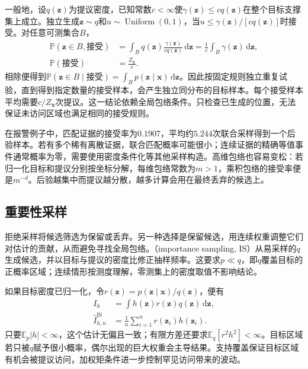 一般地，设$q(\bm{z})$为提议密度，已知常数$c<\infty$使$\gamma(\bm{z})\leq c q(\bm{z})$在整个目标支撑集上成立。独立生成$\bm{z}\sim q$和$u\sim\operatorname{Uniform}(0,1)$，当$u\leq\gamma(\bm{z})/[c q(\bm{z})]$时接受。对任意可测集合$B$，
\begin{equation}
  \begin{aligned}
    \mathbb{P}(\bm{z}\in B,\text{接受})
      &=\int_B q(\bm{z})\frac{\gamma(\bm{z})}{c q(\bm{z})}
        \,\mathrm{d}\bm{z}
        =\frac{1}{c}\int_B\gamma(\bm{z})\,\mathrm{d}\bm{z},\\
    \mathbb{P}(\text{接受})&=\frac{Z_{\bm{x}}}{c}.
  \end{aligned}
  \label{eq:pgm-sampling-rejection}
\end{equation}
相除便得到$\mathbb{P}(\bm{z}\in B\mid\text{接受})=\int_B p(\bm{z}\mid\bm{x})\,\mathrm{d}\bm{z}$。因此按固定规则独立重复试验，直到得到指定数量的接受样本，会产生独立同分布的目标样本。每个接受样本平均需要$c/Z_{\bm{x}}$次提议。这一结论依赖全局包络条件。只检查已生成的位置，无法保证未访问区域也满足相同的接受规则。

在报警例子中，匹配证据的接受率为$0.1907$，平均约$5.244$次联合采样得到一个后验样本。若有多个稀有离散证据，联合匹配概率可能很小；连续证据的精确等值事件通常概率为零，需要使用密度条件化等其他采样构造。高维包络也容易变松：若归一化目标和提议分别按坐标分解，每维包络常数为$m>1$，乘积包络的接受率便是$m^{-d}$。后验越集中而提议越分散，越多计算会用在最终丢弃的候选上。

\subsection{重要性采样}
\label{sec:pgm-sampling-importance}

拒绝采样将候选筛选为保留或丢弃。另一种选择是保留候选，用连续权重调整它们对估计的贡献，从而避免寻找全局包络。（importance sampling, IS）从易采样的$q$生成候选，并以目标与提议的密度比修正抽样频率。这要求$p\ll q$，即$q$覆盖目标的正概率区域；连续情形按测度理解，零测集上的密度取值不影响结论。

如果目标密度已归一化，令$r(\bm{z})=p(\bm{z}\mid\bm{x})/q(\bm{z})$，便有
\begin{equation}
  \begin{aligned}
    I_h&=\int h(\bm{z})r(\bm{z})q(\bm{z})\,\mathrm{d}\bm{z},\\
    \widehat I_{h,n}^{\mathrm{IS}}
      &=\frac{1}{n}\sum_{i=1}^{n}r(\bm{z}_i)h(\bm{z}_i).
  \end{aligned}
  \label{eq:pgm-sampling-is}
\end{equation}
只要$\mathbb{E}_p|h|<\infty$，这个估计无偏且一致；有限方差还要求$\mathbb{E}_q[r^2h^2]<\infty$。目标区域若只被$q$赋予很小概率，偶尔出现的巨大权重会主导结果。支持覆盖保证目标区域有机会被提议访问，加权矩条件进一步控制罕见访问带来的波动。

